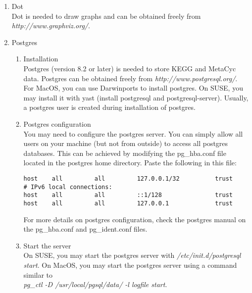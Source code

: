 \documentclass{book}
\begin{document}
\begin{enumerate}

\item Dot\\
Dot is needed to draw graphs and can be obtained freely from \textit{http://www.graphviz.org/}.

\item Postgres
\begin{enumerate}
\item Installation\\
Postgres (version 8.2 or later) is needed to store KEGG and MetaCyc data.
Postgres can be obtained freely from
\textit{http://www.postgresql.org/}.
For MacOS, you can use Darwinports to install postgres. On SUSE, you may
install it with yast (install postgresql and postgresql-server).
Usually, a postgres user is created during installation of postgres.

\item Postgres configuration\\
You may need to configure the postgres server. You can simply
allow all users on your machine (but not from outside) to access
all postgres databases.
This can be achieved by modifying the pg\_hba.conf file
located in the postgres home directory. Paste the following in this file:
\begin{footnotesize}
\begin{verbatim}
host    all         all         127.0.0.1/32          trust
# IPv6 local connections:
host    all         all         ::1/128               trust
host    all         all         127.0.0.1             trust
\end{verbatim}
\end{footnotesize}
For more details on postgres configuration, check the postgres manual
on the pg\_hba.conf and pg\_ident.conf files.

\item Start the server\\
On SUSE, you may start the postgres server with
\textit{/etc/init.d/postgresql start}. On MacOS, you may start the postgres server
using a command similar to\\
\textit{pg\_ctl -D /usr/local/pgsql/data/ -l logfile start}.\\


\end{enumerate}
\end{enumerate}
\end{document}
